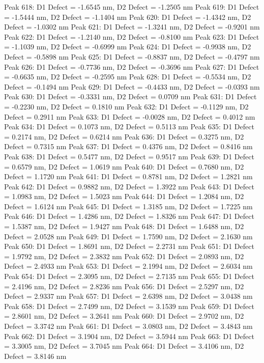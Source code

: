 \documentclass{article}
\begin{document}
Peak 618: D1 Defect = -1.6545 nm, D2 Defect = -1.2505 nm
Peak 619: D1 Defect = -1.5444 nm, D2 Defect = -1.1404 nm
Peak 620: D1 Defect = -1.4342 nm, D2 Defect = -1.0302 nm
Peak 621: D1 Defect = -1.3241 nm, D2 Defect = -0.9201 nm
Peak 622: D1 Defect = -1.2140 nm, D2 Defect = -0.8100 nm
Peak 623: D1 Defect = -1.1039 nm, D2 Defect = -0.6999 nm
Peak 624: D1 Defect = -0.9938 nm, D2 Defect = -0.5898 nm
Peak 625: D1 Defect = -0.8837 nm, D2 Defect = -0.4797 nm
Peak 626: D1 Defect = -0.7736 nm, D2 Defect = -0.3696 nm
Peak 627: D1 Defect = -0.6635 nm, D2 Defect = -0.2595 nm
Peak 628: D1 Defect = -0.5534 nm, D2 Defect = -0.1494 nm
Peak 629: D1 Defect = -0.4433 nm, D2 Defect = -0.0393 nm
Peak 630: D1 Defect = -0.3331 nm, D2 Defect = 0.0709 nm
Peak 631: D1 Defect = -0.2230 nm, D2 Defect = 0.1810 nm
Peak 632: D1 Defect = -0.1129 nm, D2 Defect = 0.2911 nm
Peak 633: D1 Defect = -0.0028 nm, D2 Defect = 0.4012 nm
Peak 634: D1 Defect = 0.1073 nm, D2 Defect = 0.5113 nm
Peak 635: D1 Defect = 0.2174 nm, D2 Defect = 0.6214 nm
Peak 636: D1 Defect = 0.3275 nm, D2 Defect = 0.7315 nm
Peak 637: D1 Defect = 0.4376 nm, D2 Defect = 0.8416 nm
Peak 638: D1 Defect = 0.5477 nm, D2 Defect = 0.9517 nm
Peak 639: D1 Defect = 0.6579 nm, D2 Defect = 1.0619 nm
Peak 640: D1 Defect = 0.7680 nm, D2 Defect = 1.1720 nm
Peak 641: D1 Defect = 0.8781 nm, D2 Defect = 1.2821 nm
Peak 642: D1 Defect = 0.9882 nm, D2 Defect = 1.3922 nm
Peak 643: D1 Defect = 1.0983 nm, D2 Defect = 1.5023 nm
Peak 644: D1 Defect = 1.2084 nm, D2 Defect = 1.6124 nm
Peak 645: D1 Defect = 1.3185 nm, D2 Defect = 1.7225 nm
Peak 646: D1 Defect = 1.4286 nm, D2 Defect = 1.8326 nm
Peak 647: D1 Defect = 1.5387 nm, D2 Defect = 1.9427 nm
Peak 648: D1 Defect = 1.6488 nm, D2 Defect = 2.0528 nm
Peak 649: D1 Defect = 1.7590 nm, D2 Defect = 2.1630 nm
Peak 650: D1 Defect = 1.8691 nm, D2 Defect = 2.2731 nm
Peak 651: D1 Defect = 1.9792 nm, D2 Defect = 2.3832 nm
Peak 652: D1 Defect = 2.0893 nm, D2 Defect = 2.4933 nm
Peak 653: D1 Defect = 2.1994 nm, D2 Defect = 2.6034 nm
Peak 654: D1 Defect = 2.3095 nm, D2 Defect = 2.7135 nm
Peak 655: D1 Defect = 2.4196 nm, D2 Defect = 2.8236 nm
Peak 656: D1 Defect = 2.5297 nm, D2 Defect = 2.9337 nm
Peak 657: D1 Defect = 2.6398 nm, D2 Defect = 3.0438 nm
Peak 658: D1 Defect = 2.7499 nm, D2 Defect = 3.1539 nm
Peak 659: D1 Defect = 2.8601 nm, D2 Defect = 3.2641 nm
Peak 660: D1 Defect = 2.9702 nm, D2 Defect = 3.3742 nm
Peak 661: D1 Defect = 3.0803 nm, D2 Defect = 3.4843 nm
Peak 662: D1 Defect = 3.1904 nm, D2 Defect = 3.5944 nm
Peak 663: D1 Defect = 3.3005 nm, D2 Defect = 3.7045 nm
Peak 664: D1 Defect = 3.4106 nm, D2 Defect = 3.8146 nm
\end{document}
